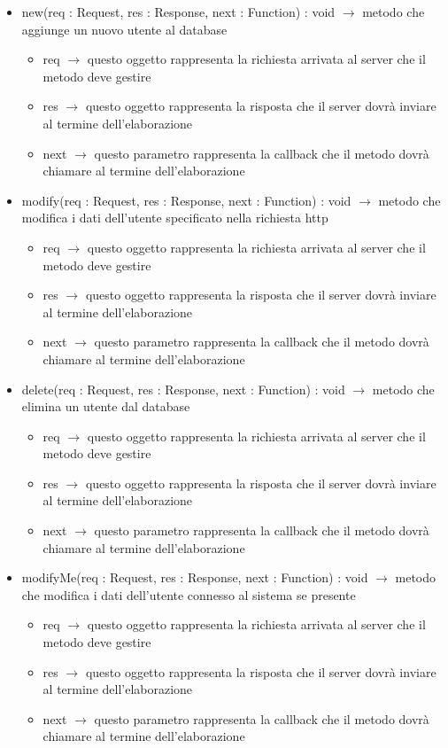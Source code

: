 \begin{description}
\begin{itemize}
	\item new(req : Request, res : Response, next : Function) : void $\rightarrow$ metodo che aggiunge un nuovo utente al database\begin{itemize}
		\item req $\rightarrow$ questo oggetto rappresenta la richiesta arrivata al server che il metodo deve gestire
		\item res $\rightarrow$ questo oggetto rappresenta la risposta che il server dovrà inviare al termine dell'elaborazione
		\item next $\rightarrow$ questo parametro rappresenta la callback che il metodo dovrà chiamare al termine dell’elaborazione
	\end{itemize}
	
	\item modify(req : Request, res : Response, next : Function) : void $\rightarrow$ metodo che modifica i dati dell'utente specificato nella richiesta http\begin{itemize}
		\item req $\rightarrow$ questo oggetto rappresenta la richiesta arrivata al server che il metodo deve gestire
		\item res $\rightarrow$ questo oggetto rappresenta la risposta che il server dovrà inviare al termine dell'elaborazione
		\item next $\rightarrow$ questo parametro rappresenta la callback che il metodo dovrà chiamare al termine dell’elaborazione
	\end{itemize}
	
	\item delete(req : Request, res : Response, next : Function) : void $\rightarrow$ metodo che elimina un utente dal database\begin{itemize}
		\item req $\rightarrow$ questo oggetto rappresenta la richiesta arrivata al server che il metodo deve gestire
		\item res $\rightarrow$ questo oggetto rappresenta la risposta che il server dovrà inviare al termine dell'elaborazione
		\item next $\rightarrow$ questo parametro rappresenta la callback che il metodo dovrà chiamare al termine dell’elaborazione
	\end{itemize}
	
	\item modifyMe(req : Request, res : Response, next : Function) : void $\rightarrow$ metodo che modifica i dati dell'utente connesso al sistema se presente\begin{itemize}
		\item req $\rightarrow$ questo oggetto rappresenta la richiesta arrivata al server che il metodo deve gestire
		\item res $\rightarrow$ questo oggetto rappresenta la risposta che il server dovrà inviare al termine dell'elaborazione
		\item next $\rightarrow$ questo parametro rappresenta la callback che il metodo dovrà chiamare al termine dell’elaborazione
	\end{itemize}
	

\end{itemize}
\end{description}
